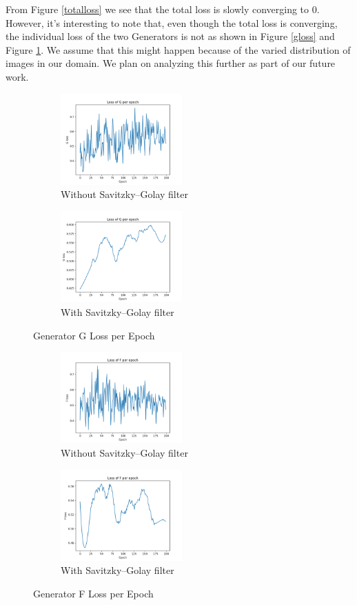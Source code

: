 \documentclass{article}
\begin{document}
From Figure \ref{totalloss} we see that the total loss is slowly converging to 0. However, it's interesting to note that, even though the total loss is converging, the individual loss of the two Generators is not as shown in Figure \ref{gloss} and Figure \ref{floss}. We assume that this might happen because of the varied distribution of images in our domain. We plan on analyzing this further as part of our future work. 

\begin{figure}[H]
	\begin{subfigure}{0.5\textwidth}
		\centering
		\includegraphics[width=0.9\linewidth, height=35mm]{images/g}
		\caption{Without Savitzky–Golay filter}
	\end{subfigure}
	\begin{subfigure}{.5\textwidth}
		\centering
		\includegraphics[width=.9\linewidth,height=35mm]{images/sg}
		\caption{With Savitzky–Golay filter}
	\end{subfigure}
	\caption{Generator G Loss per Epoch}
	\label{gloss}
	
	\begin{subfigure}{0.5\textwidth}
		\centering
		\includegraphics[width=0.9\linewidth, height=35mm]{images/f}
		\caption{Without Savitzky–Golay filter}
	\end{subfigure}
	\begin{subfigure}{.5\textwidth}
		\centering
		\includegraphics[width=.9\linewidth,height=35mm]{images/sf}
		\caption{With Savitzky–Golay filter}
	\end{subfigure}
	\caption{Generator F Loss per Epoch}
	\label{floss}
\end{figure}
\end{document}
